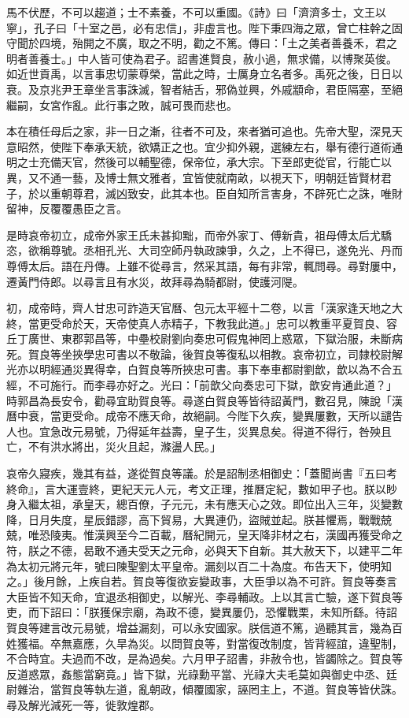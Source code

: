 \begin{pinyinscope}
馬不伏歷，不可以趨道；士不素養，不可以重國。《詩》曰「濟濟多士，文王以寧」，孔子曰「十室之邑，必有忠信」，非虛言也。陛下秉四海之眾，曾亡柱幹之固守聞於四境，殆開之不廣，取之不明，勸之不篤。傳曰：「土之美者善養禾，君之明者善養士。」中人皆可使為君子。詔書進賢良，赦小過，無求備，以博聚英俊。如近世貢禹，以言事忠切蒙尊榮，當此之時，士厲身立名者多。禹死之後，日日以衰。及京兆尹王章坐言事誅滅，智者結舌，邪偽並興，外戚顓命，君臣隔塞，至絕繼嗣，女宮作亂。此行事之敗，誠可畏而悲也。

本在積任母后之家，非一日之漸，往者不可及，來者猶可追也。先帝大聖，深見天意昭然，使陛下奉承天統，欲矯正之也。宜少抑外親，選練左右，舉有德行道術通明之士充備天官，然後可以輔聖德，保帝位，承大宗。下至郎吏從官，行能亡以異，又不通一藝，及博士無文雅者，宜皆使就南畝，以視天下，明朝廷皆賢材君子，於以重朝尊君，滅凶致安，此其本也。臣自知所言害身，不辟死亡之誅，唯財留神，反覆覆愚臣之言。

是時哀帝初立，成帝外家王氏未甚抑黜，而帝外家丁、傅新貴，祖母傅太后尤驕恣，欲稱尊號。丞相孔光、大司空師丹執政諫爭，久之，上不得已，遂免光、丹而尊傅太后。語在丹傳。上雖不從尋言，然采其語，每有非常，輒問尋。尋對屢中，遷黃門侍郎。以尋言且有水災，故拜尋為騎都尉，使護河隄。

初，成帝時，齊人甘忠可詐造天官曆、包元太平經十二卷，以言「漢家逢天地之大終，當更受命於天，天帝使真人赤精子，下教我此道。」忠可以教重平夏賀良、容丘丁廣世、東郡郭昌等，中壘校尉劉向奏忠可假鬼神罔上惑眾，下獄治服，未斷病死。賀良等坐挾學忠可書以不敬論，後賀良等復私以相教。哀帝初立，司隸校尉解光亦以明經通災異得幸，白賀良等所挾忠可書。事下奉車都尉劉歆，歆以為不合五經，不可施行。而李尋亦好之。光曰：「前歆父向奏忠可下獄，歆安肯通此道？」時郭昌為長安令，勸尋宜助賀良等。尋遂白賀良等皆待詔黃門，數召見，陳說「漢曆中衰，當更受命。成帝不應天命，故絕嗣。今陛下久疾，變異屢數，天所以譴告人也。宜急改元易號，乃得延年益壽，皇子生，災異息矣。得道不得行，咎殃且亡，不有洪水將出，災火且起，滌盪人民。」

哀帝久寢疾，幾其有益，遂從賀良等議。於是詔制丞相御史：「蓋聞尚書『五曰考終命』，言大運壹終，更紀天元人元，考文正理，推曆定紀，數如甲子也。朕以眇身入繼太祖，承皇天，總百僚，子元元，未有應天心之效。即位出入三年，災變數降，日月失度，星辰錯謬，高下貿易，大異連仍，盜賊並起。朕甚懼焉，戰戰兢兢，唯恐陵夷。惟漢興至今二百載，曆紀開元，皇天降非材之右，漢國再獲受命之符，朕之不德，曷敢不通夫受天之元命，必與天下自新。其大赦天下，以建平二年為太初元將元年，號曰陳聖劉太平皇帝。漏刻以百二十為度。布告天下，使明知之。」後月餘，上疾自若。賀良等復欲妄變政事，大臣爭以為不可許。賀良等奏言大臣皆不知天命，宜退丞相御史，以解光、李尋輔政。上以其言亡驗，遂下賀良等吏，而下詔曰：「朕獲保宗廟，為政不德，變異屢仍，恐懼戰栗，未知所繇。待詔賀良等建言改元易號，增益漏刻，可以永安國家。朕信道不篤，過聽其言，幾為百姓獲福。卒無嘉應，久旱為災。以問賀良等，對當復改制度，皆背經誼，違聖制，不合時宜。夫過而不改，是為過矣。六月甲子詔書，非赦令也，皆蠲除之。賀良等反道惑眾，姦態當窮竟。」皆下獄，光祿勳平當、光祿大夫毛莫如與御史中丞、廷尉雜治，當賀良等執左道，亂朝政，傾覆國家，誣罔主上，不道。賀良等皆伏誅。尋及解光減死一等，徙敦煌郡。


\end{pinyinscope}

